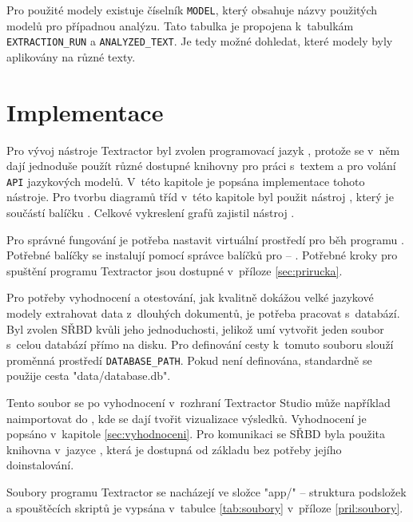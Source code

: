 \documentclass[czech, bc, kiv, he, iso690numb, pdf]{fasthesis}
\begin{document}
Pro použité modely existuje číselník \verb"MODEL", který obsahuje názvy použitých modelů pro případnou analýzu. Tato tabulka je propojena k~tabulkám \verb"EXTRACTION_RUN" a \verb"ANALYZED_TEXT". Je tedy možné dohledat, které modely byly aplikovány na různé texty.

\chapter{Implementace}
Pro vývoj nástroje Textractor byl zvolen programovací jazyk , protože se v~něm dají jednoduše použít různé dostupné knihovny pro práci s~textem a pro volání \verb"API" jazykových modelů. V~této kapitole je popsána implementace tohoto nástroje. Pro tvorbu diagramů tříd v~této kapitole byl použit nástroj , který je součástí balíčku  \cite{pylint}. Celkové vykreslení grafů zajistil nástroj .

Pro správné fungování je potřeba nastavit virtuální prostředí pro běh programu . Potřebné balíčky se instalují pomocí správce balíčků pro  -- . Potřebné kroky pro spuštění programu Textractor jsou dostupné v~příloze \ref{sec:prirucka}.

Pro potřeby vyhodnocení a otestování, jak kvalitně dokážou velké jazykové modely extrahovat data z~dlouhých dokumentů, je potřeba pracovat s~databází. Byl zvolen SŘBD  \cite{sqlite} kvůli jeho jednoduchosti, jelikož umí vytvořit jeden soubor s~celou databází přímo na disku. Pro definování cesty k~tomuto souboru slouží proměnná prostředí \verb"DATABASE_PATH". Pokud není definována, standardně se použije cesta \filename"data/database.db".

Tento soubor se po vyhodnocení v~rozhraní Textractor Studio může například naimportovat do  \cite{pbi}, kde se dají tvořit vizualizace výsledků. Vyhodnocení je popsáno v~kapitole \ref{sec:vyhodnoceni}. Pro komunikaci se SŘBD byla použita knihovna  v~jazyce , která je dostupná od základu bez potřeby jejího doinstalování.

Soubory programu Textractor se nacházejí ve složce \filename"app/" -- struktura podsložek a spouštěcích skriptů je vypsána v~tabulce \ref{tab:soubory} v~příloze \ref{pril:soubory}.
\end{document}
